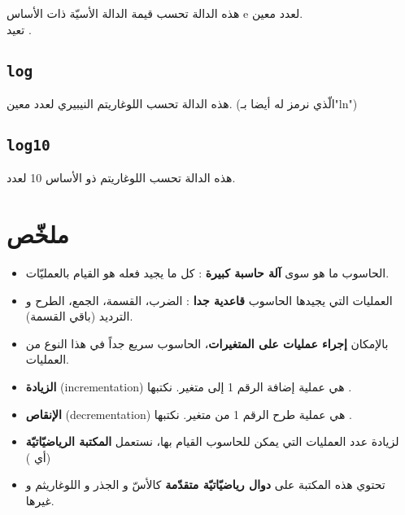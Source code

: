 هذه الدالة تحسب قيمة الدالة الأسيّة ذات الأساس
\textenglish{e}
لعدد معين.\\
تعيد
.

\subsection{\texttt{log}}

هذه الدالة تحسب اللوغاريتم النيبيري لعدد معين. (الّذي نرمز له أيضا بـ"\textenglish{ln}")

\subsection{\texttt{log10}}

هذه الدالة تحسب اللوغاريتم ذو الأساس 10 لعدد.

\section*{ملخّص}

\begin{itemize}
  \item الحاسوب ما هو سوى
\textbf{آلة حاسبة كبيرة}
: كل ما يجيد فعله هو القيام بالعمليّات.
  \item العمليات التي يجيدها الحاسوب
\textbf{قاعدية جدا}
: الضرب، القسمة، الجمع، الطرح و الترديد (باقي القسمة).
  \item بالإمكان
\textbf{إجراء عمليات على المتغيرات}،
الحاسوب سريع جداً في هذا النوع من العمليات.
  \item \textbf{الزيادة}
(\textenglish{incrementation})
هي عملية إضافة الرقم 1 إلى متغير. نكتبها
.
  \item \textbf{الإنقاص}
(\textenglish{decrementation})
هي عملية طرح الرقم 1 من متغير. نكتبها
.
  \item لزيادة عدد العمليات التي يمكن للحاسوب القيام بها، نستعمل
\textbf{المكتبة الرياضيّاتيّة}
(أي
)
  \item تحتوي هذه المكتبة على
\textbf{دوال رياضيّاتيّة متقدّمة}
كالأسّ و الجذر و اللوغاريثم و غيرها.
\end{itemize}
